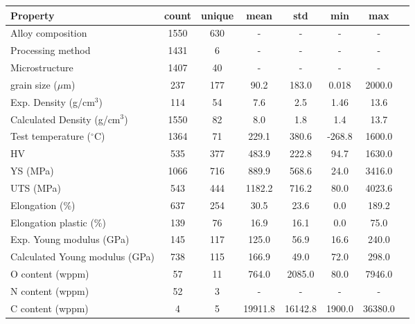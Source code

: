 \begin{tabular}{lccccccc}
\toprule
Property & count & unique & mean & std & min & max \\
\midrule
Alloy composition & 1550 & 630 & - & - & - & - \\
Processing method & 1431 & 6 & - & - & - & - \\
Microstructure & 1407 & 40 & - & - & - & - \\
grain size ($\mu$m) & 237 & 177 & 90.2 & 183.0 & 0.018 & 2000.0 \\
Exp. Density (g/cm$^3$) & 114 & 54 & 7.6 & 2.5 & 1.46 & 13.6 \\
Calculated Density (g/cm$^3$) & 1550 & 82 & 8.0 & 1.8 & 1.4 & 13.7 \\
Test temperature ($^\circ$C) & 1364 & 71 & 229.1 & 380.6 & -268.8 & 1600.0 \\
HV & 535 & 377 & 483.9 & 222.8 & 94.7 & 1630.0 \\
YS (MPa) & 1066 & 716 & 889.9 & 568.6 & 24.0 & 3416.0 \\
UTS (MPa) & 543 & 444 & 1182.2 & 716.2 & 80.0 & 4023.6 \\
Elongation (\%) & 637 & 254 & 30.5 & 23.6 & 0.0 & 189.2 \\
Elongation plastic (\%) & 139 & 76 & 16.9 & 16.1 & 0.0 & 75.0 \\
Exp. Young modulus (GPa) & 145 & 117 & 125.0 & 56.9 & 16.6 & 240.0 \\
Calculated Young modulus (GPa) & 738 & 115 & 166.9 & 49.0 & 72.0 & 298.0 \\
O content (wppm) & 57 & 11 & 764.0 & 2085.0 & 80.0 & 7946.0 \\
N content (wppm) & 52 & 3 & - & - & - & - \\
C content (wppm) & 4 & 5 & 19911.8 & 16142.8 & 1900.0 & 36380.0 \\
\bottomrule
\end{tabular}
